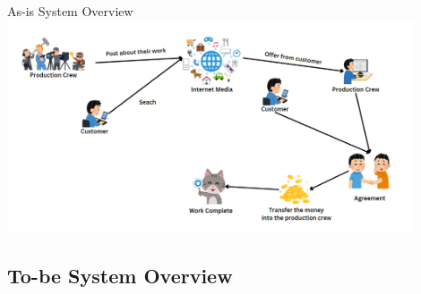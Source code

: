 \documentclass[aspectratio=169]{beamer}
\begin{document}
\begin{frame}{As-is System Overview}
    \centering
    \includegraphics[width=0.9\textwidth]{asis.png}
\end{frame}

\subsection{To-be System Overview}
\end{document}
